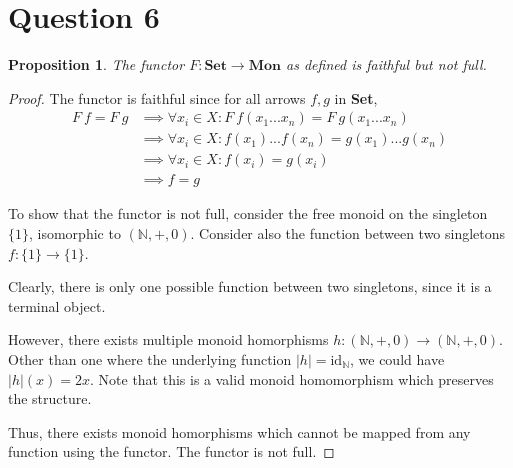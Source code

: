 \documentclass[11pt]{article} %
\newtheorem{proposition}[theorem]{Proposition}
\theoremstyle{definition}
\begin{document}
\section*{Question 6}
\addtocounter{section}{1}
\begin{proposition}
  The functor $F:\textbf{Set}\rightarrow \textbf{Mon}$ as defined is faithful but not full.
\end{proposition}
\begin{proof}
The functor is faithful since for all arrows $f,g$ in \textbf{Set},
\begin{equation}
\begin{aligned}
  F\ f = F\ g &\implies \forall x_i \in X: F\ f(x_1...x_n) = F\ g(x_1...x_n)\\
  &\implies \forall x_i\in X:f(x_1)...f(x_n)=g(x_1)...g(x_n)\\
  &\implies \forall x_i\in X:f(x_i)=g(x_i)\\
  &\implies f=g
\end{aligned}
\end{equation}

To show that the functor is not full, consider the free monoid on the singleton $\{1\}$, 
isomorphic to $(\mathbb{N},+,0)$.
Consider also the function between two singletons $f:\{1\}\rightarrow \{1\}$.

Clearly, there is only one possible function between two singletons, since it is a terminal object.

However, there exists multiple monoid homorphisms $h:(\mathbb{N},+,0)\rightarrow (\mathbb{N},+,0)$.
Other than one where the underlying function $|h|=\text{id}_{\mathbb{N}}$, we could have $|h|(x)=2x$.
Note that this is a valid monoid homomorphism which preserves the structure.

Thus, there exists monoid homorphisms which cannot be mapped from any function using the functor.
The functor is not full.

\end{proof}
\end{document}
